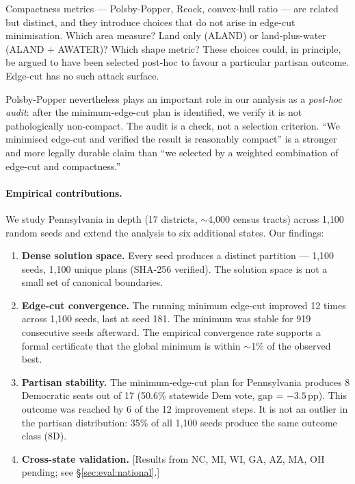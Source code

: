 Compactness metrics --- Polsby-Popper, Reock, convex-hull ratio --- are
related but distinct, and they introduce choices that do not arise in
edge-cut minimisation. Which area measure? Land only (ALAND) or
land-plus-water (ALAND + AWATER)? Which shape metric? These choices could,
in principle, be argued to have been selected post-hoc to favour a particular
partisan outcome. Edge-cut has no such attack surface.

Polsby-Popper nevertheless plays an important role in our analysis as a
\emph{post-hoc audit}: after the minimum-edge-cut plan is identified, we
verify it is not pathologically non-compact. The audit is a check, not a
selection criterion. ``We minimised edge-cut and verified the result is
reasonably compact'' is a stronger and more legally durable claim than
``we selected by a weighted combination of edge-cut and compactness.''

\paragraph{Empirical contributions.}
We study Pennsylvania in depth (17 districts, $\sim$4{,}000 census tracts)
across 1{,}100 random seeds and extend the analysis to six additional
states. Our findings:

\begin{enumerate}
  \item \textbf{Dense solution space.} Every seed produces a distinct
        partition --- 1{,}100 seeds, 1{,}100 unique plans (SHA-256
        verified). The solution space is not a small set of canonical
        boundaries.
  \item \textbf{Edge-cut convergence.} The running minimum edge-cut
        improved 12 times across 1{,}100 seeds, last at seed 181.
        The minimum was stable for 919 consecutive seeds afterward.
        The empirical convergence rate supports a formal certificate
        that the global minimum is within $\sim$1\% of the observed best.
  \item \textbf{Partisan stability.} The minimum-edge-cut plan for
        Pennsylvania produces 8 Democratic seats out of 17 (50.6\%
        statewide Dem vote, gap = $-3.5$\,pp). This outcome was reached
        by 6 of the 12 improvement steps. It is not an outlier in the
        partisan distribution: 35\% of all 1{,}100 seeds produce
        the same outcome class (8D).
  \item \textbf{Cross-state validation.} [Results from NC, MI, WI, GA,
        AZ, MA, OH pending; see \S\ref{sec:eval:national}.]
\end{enumerate}

